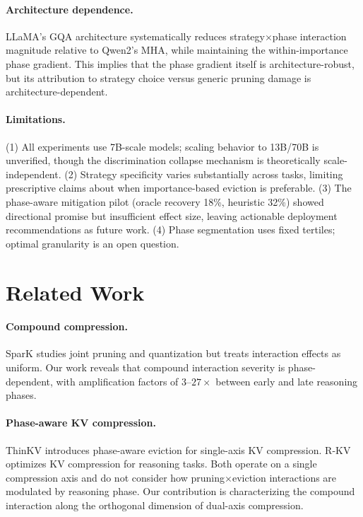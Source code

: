 \documentclass[11pt]{article}
\begin{document}
\paragraph{Architecture dependence.} LLaMA's GQA architecture systematically reduces strategy$\times$phase interaction magnitude relative to Qwen2's MHA, while maintaining the within-importance phase gradient. This implies that the phase gradient itself is architecture-robust, but its attribution to strategy choice versus generic pruning damage is architecture-dependent.

\paragraph{Limitations.} (1) All experiments use 7B-scale models; scaling behavior to 13B/70B is unverified, though the discrimination collapse mechanism is theoretically scale-independent. (2) Strategy specificity varies substantially across tasks, limiting prescriptive claims about when importance-based eviction is preferable. (3) The phase-aware mitigation pilot (oracle recovery 18\%, heuristic 32\%) showed directional promise but insufficient effect size, leaving actionable deployment recommendations as future work. (4) Phase segmentation uses fixed tertiles; optimal granularity is an open question.

\section{Related Work}

\paragraph{Compound compression.} SparK \citep{spark2025} studies joint pruning and quantization but treats interaction effects as uniform. Our work reveals that compound interaction severity is phase-dependent, with amplification factors of $3$--$27\times$ between early and late reasoning phases.

\paragraph{Phase-aware KV compression.} ThinKV \citep{thinkv2025} introduces phase-aware eviction for single-axis KV compression. R-KV \citep{rkv2025} optimizes KV compression for reasoning tasks. Both operate on a single compression axis and do not consider how pruning$\times$eviction interactions are modulated by reasoning phase. Our contribution is characterizing the compound interaction along the orthogonal dimension of dual-axis compression.
\end{document}
